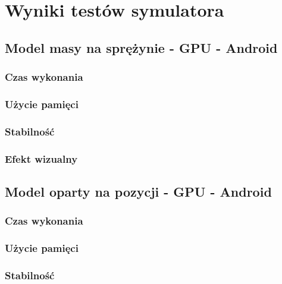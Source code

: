 \chapter{Wyniki testów symulatora}
\label{t:wyniki}


	\section{Model masy na sprężynie - GPU - Android}
	\label{t:wyniki:masa_gpu_andro}
	
		\subsection{Czas wykonania}
		\label{t:wyniki:masa_gpu_andro:czas}
		
		\subsection{Użycie pamięci}
		\label{t:wyniki:masa_gpu_andro:pamiec}
		
		\subsection{Stabilność}
		\label{t:wyniki:masa_gpu_andro:stabilnosc}
		
		\subsection{Efekt wizualny}
		\label{t:wyniki:masa_gpu_andro:wizual}
		
	
	\section{Model oparty na pozycji - GPU - Android}
	\label{t:wyniki:poz_gpu_andro}
	
		\subsection{Czas wykonania}
		\label{t:wyniki:poz_gpu_andro:czas}
		
		\subsection{Użycie pamięci}
		\label{t:wyniki:poz_gpu_andro:pamiec}
		
		\subsection{Stabilność}
		\label{t:wyniki:poz_gpu_andro:stabilnosc}
		
